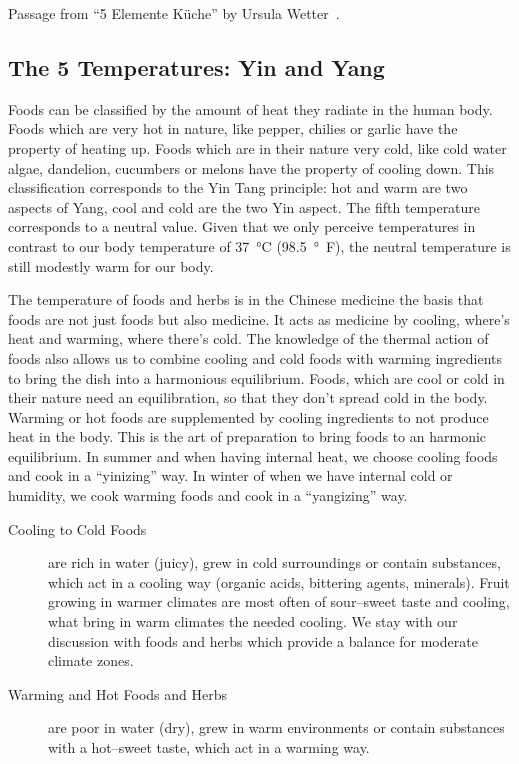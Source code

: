 \documentclass[../main.tex]{subfiles}
\begin{document}
Passage from ``5 Elemente K\"uche'' by Ursula Wetter~\cite{5Elemente}.

\subsection{The 5 Temperatures: Yin and Yang}

Foods can be classified by the amount of heat they radiate in the human body.
Foods which are very hot in nature, like pepper, chilies or garlic have the property of heating up.
Foods which are in their nature very cold, like cold water algae, dandelion, cucumbers or melons have the property of cooling down.
This classification corresponds to the Yin Tang principle: hot and warm are two aspects of Yang,
cool and cold are the two Yin aspect.
The fifth temperature corresponds to a neutral value.
Given that we only perceive temperatures in contrast to our body temperature of \SI{37}{\celsius} (\SI{98.5}{\degree\F}),
the neutral temperature is still modestly warm for our body.

The temperature of foods and herbs is in the Chinese medicine the basis that foods are not just foods but also medicine.
It acts as medicine by cooling, where's heat and warming, where there's cold.
The knowledge of the thermal action of foods also allows us to combine cooling and cold foods with warming ingredients to bring the dish into a
harmonious equilibrium.
Foods, which are cool or cold in their nature need an equilibration, so that they don't spread cold in the body.
Warming or hot foods are supplemented by cooling ingredients to not produce heat in the body.
This is the art of preparation to bring foods to an harmonic equilibrium.
In summer and when having internal heat, we choose cooling foods and cook in a ``yinizing'' way.
In winter of when we have internal cold or humidity, we cook warming foods and cook in a ``yangizing'' way.

\begin{description}
\item[Cooling to Cold Foods] are rich in water (juicy), grew in cold surroundings or contain substances, which act in a cooling way (organic
  acids, bittering agents, minerals).
  Fruit growing in warmer climates are most often of sour--sweet taste and cooling, what bring in warm climates the needed cooling.
  We stay with our discussion with foods and herbs which provide a balance for moderate climate zones.
\item[Warming and Hot Foods and Herbs] are poor in water (dry), grew in warm environments or contain substances with a hot--sweet taste,
  which act in a warming way.
\end{description}
\end{document}
